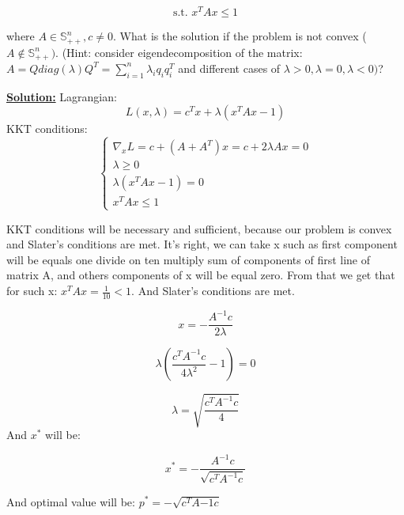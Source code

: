 \begin{equation*}
   \text{s.t. } x^TAx \leq 1
\end{equation*}

where $A \in \mathds{S}_{++}^n, c \not = 0$. What is the solution if the problem is not convex ($A \not \in \mathds{S}_{++}^n)$. (Hint: consider eigendecomposition of the matrix: $A = Q diag(\lambda)Q^T = \sum\limits_{i=1}^n \lambda_i q_i q_i^T$ and different cases of $\lambda > 0, \lambda = 0, \lambda < 0)$?

\underline{\textbf{Solution:}}
Lagrangian: 
\begin{equation*}
    L(x, \lambda) = c^Tx + \lambda (x^TAx - 1)
\end{equation*}
KKT conditions:
\begin{equation*}
    \begin{cases}
    \nabla_x L = c + (A+A^T)x = c + 2\lambda Ax = 0\\
    \lambda \geq 0 \\
    \lambda (x^TAx - 1) = 0\\
    x^TAx \leq 1
    \end{cases}
\end{equation*}

KKT conditions will be necessary and sufficient, because our problem is convex and Slater's conditions are met. It's right, we can take x such as first component will be equals one divide on ten multiply sum of components of first line of matrix A, and others components of x will be equal zero. From that we get that for such x: $x^TAx = \frac{1}{10} < 1$. And Slater's conditions are met.

\begin{equation*}
    x = -\frac{A^{-1}c}{2\lambda}
\end{equation*}

\begin{equation*}
    \lambda(\frac{c^TA^{-1}c}{4\lambda^2} - 1) = 0
\end{equation*}

\begin{equation*}
    \lambda = \sqrt{\frac{c^TA^{-1}c}{4}}
\end{equation*}
And $x^*$ will be:

\begin{equation*}
    x^* = - \frac{A^{-1}c}{\sqrt{c^TA^{-1}c}}
\end{equation*}

And optimal value will be: $p^* = - \sqrt{c^TA{-1}c}$

